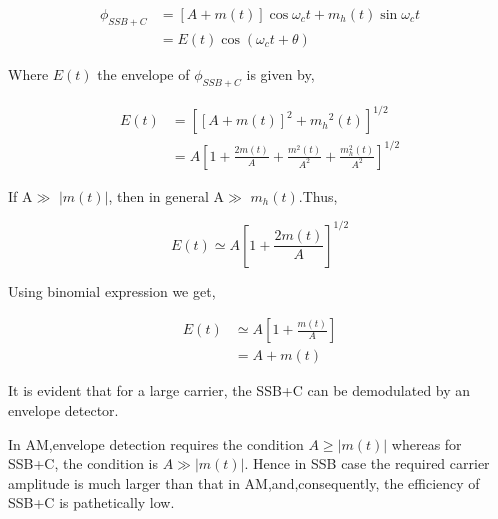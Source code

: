 \begin{equation}
	\begin{split}
	\phi_{SSB+C} & = [A+m(t)]\cos{\omega_ct}+m_h(t)\sin{\omega_ct} \\
	& = E(t) \cos{(\omega_ct+\theta)}
	\end{split}
\end{equation}

Where $E(t)$ the envelope of $\phi_{SSB+C}$ is given by,

\begin{equation}
\begin{split}
 E(t) & =[[A+m(t)]^2 + {m_h}^2(t)]^{1/2} \\
 & = A[1+\frac{2m(t)}{A}+\frac{m^2(t)}{A^2}+\frac{m_h^2(t)}{A^2}]^{1/2}
\end{split}	
\end{equation}

If A$\gg$ $|m(t)|$, then in general A$\gg$ $m_h(t)$.Thus,

\begin{equation}
	E(t) \simeq A[1+\frac{2m(t)}{A}]^{1/2}
\end{equation}

Using binomial expression we get,

\begin{equation}
	\begin{split}
	E(t) & \simeq A[1+\frac{m(t)}{A}] \\
	& =A + m(t)
	\end{split}
\end{equation}

It is evident that for a large carrier, the SSB+C can be demodulated by an envelope detector.

In AM,envelope detection requires the condition $A\geq|m(t)|$ whereas for SSB+C, the condition is $A \gg |m(t)|$. Hence in SSB case the required carrier amplitude is much larger than that in AM,and,consequently, the efficiency of SSB+C is pathetically low.  


